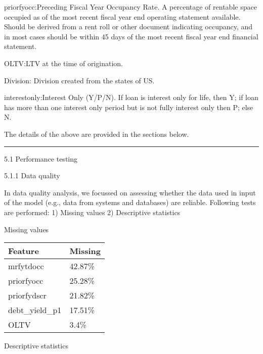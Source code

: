 priorfyocc:Preceding Fiscal Year Occupancy Rate. A percentage of
rentable space occupied as of the most recent fiscal year end operating
statement available. Should be derived from a rent roll or other
document indicating occupancy, and in most cases should be within 45
days of the most recent fiscal year end financial statement.

OLTV:LTV at the time of origination.

Division: Division created from the states of US.

interestonly:Interest Only (Y/P/N). If loan is interest only for life,
then Y; if loan has more than one interest only period but is not fully
interest only then P; else N.

The details of the above are provided in the sections below.

\begin{center}\rule{0.5\linewidth}{\linethickness}\end{center}

5.1 Performance testing

5.1.1 Data quality

In data quality analysis, we focussed on assessing whether the data used
in input of the model (e.g., data from systems and databases) are
reliable. Following tests are performed: 1) Missing values 2)
Descriptive statistics

Missing values

\begin{longtable}[]{@{}ll@{}}
\toprule
Feature & Missing\tabularnewline
\midrule
\endhead
mrfytdocc & 42.87\%\tabularnewline
priorfyocc & 25.28\%\tabularnewline
priorfydscr & 21.82\%\tabularnewline
debt\_yield\_p1 & 17.51\%\tabularnewline
OLTV & 3.4\%\tabularnewline
\bottomrule
\end{longtable}

Descriptive statistics

